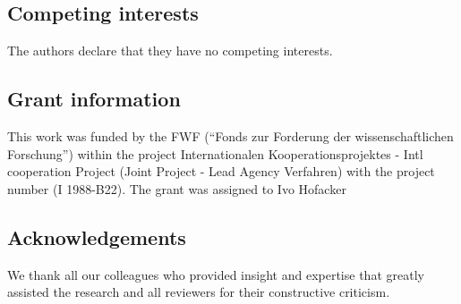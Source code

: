 \documentclass[10pt,a4paper,twocolumn]{article}
\begin{document}
\subsection*{Competing interests}

The authors declare that they have no competing interests.


\subsection*{Grant information}

This work was funded by the FWF (“Fonds zur Forderung der
wissenschaftlichen Forschung”) within the project Internationalen
Kooperationsprojektes - Intl cooperation Project (Joint Project - Lead
Agency Verfahren) with the project number (I 1988-B22). The grant was
assigned to Ivo Hofacker


\subsection*{Acknowledgements}

We thank all our colleagues who provided insight and expertise that greatly
assisted the research and all reviewers for their constructive criticism.

{\small
}

\bigskip



\begin{figure}
	\centering
	
\end{figure}
\end{document}
